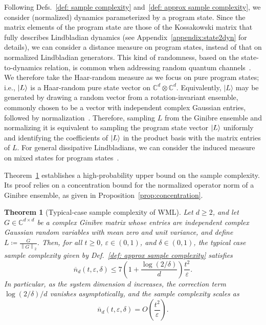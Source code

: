 \documentclass[superscriptaddress,amsmath,amssymb,aps,pra,letterpaper,tightenlines,notitlepages,12pt]{revtex4-2}
\newtheorem{theorem}{Theorem}
\begin{document}
Following Defs.~\ref{def: sample complexity} and~\ref{def: approx sample complexity}, we consider (normalized) dynamics parameterized by a program state. Since the matrix elements of the program state are those of the Kossakowski matrix that fully describes Lindbladian dynamics (see Appendix~\ref{appendix:state2dyn} for details), we can consider a distance measure on program states, instead of that on normalized Lindbladian generators. This kind of randomness, based on the state-to-dynamics relation, is common when addressing random quantum channels~\cite{bruzda2009RandomQuantumOperations, nechita2018AlmostAllQuantum, denisov2019UniversalSpectraRandom, kukulski2021GeneratingRandomQuantum}. We therefore take the Haar-random measure as we focus on pure program states; i.e., $\ket{L}$ is a Haar-random pure state vector on $\mathbb{C}^d\otimes\mathbb{C}^d$. Equivalently, $|L\rangle$ may be generated by drawing a random vector from a rotation-invariant ensemble, commonly chosen to be a vector with independent complex Gaussian entries, followed by normalization~\cite{watrous2018TheoryQuantumInformation, zyczkowski2001InducedMeasuresSpace, kukulski2021GeneratingRandomQuantum}. Therefore, sampling $L$ from the Ginibre ensemble and normalizing it is equivalent to sampling the program state vector $\ket{L}$ uniformly and identifying the coefficients of $\ket{L}$ in the product basis with the matrix entries of $L$. For general dissipative Lindbladians, we can consider the induced measure on mixed states for program states~\cite{zyczkowski2001InducedMeasuresSpace}.

Theorem~\ref{thm:average-case-WML} establishes a high-probability upper bound on the sample complexity. Its proof relies on a concentration bound for the normalized operator norm of a Ginibre ensemble, as given in Proposition~\ref{prop:concentration}.

\begin{theorem}[Typical-case sample complexity of WML]
\label{thm:average-case-WML}
Let $d\ge 2$, and let $G \in \mathbb{C}^{d \times d}$ be a complex Ginibre matrix whose entries are independent complex Gaussian random variables with mean zero and unit variance, and define $L \coloneqq \frac{G}{\left\|G\right\|_2}$.
Then, for all $t \ge 0$, $\varepsilon \in (0,1)$, and $\delta \in (0,1)$, the typical case sample complexity given by Def.~\ref{def: approx sample complexity} satisfies
\begin{equation}
    \overline{n}_d(t,\varepsilon,\delta) \le
    7 \left( 1+\frac{\log(2/\delta)}{d} \right) \frac{t^2}{\varepsilon}.
\end{equation}
In particular, as the system dimension $d$ increases, the correction term $\log(2/\delta)/d$ vanishes asymptotically, and the sample complexity scales as
\begin{equation}
    \overline{n}_d(t,\varepsilon,\delta) = O\!\left(\frac{t^2}{\varepsilon}\right).
\end{equation}
\end{theorem}
\end{document}
